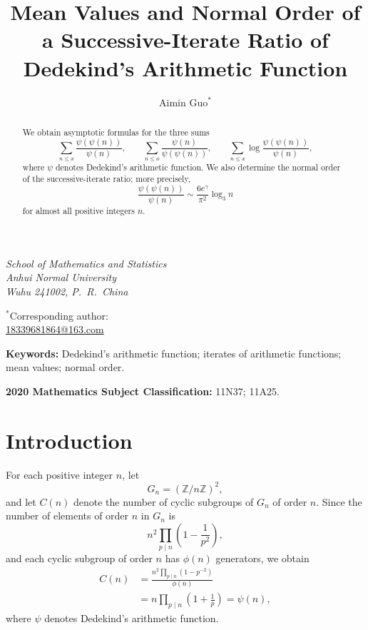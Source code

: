 \documentclass{article}
\title{Mean Values and Normal Order of a Successive-Iterate Ratio of Dedekind's Arithmetic Function}
\author{Aimin Guo$^{*}$}
\date{}
\theoremstyle{remark}
\begin{document}
\maketitle
\vspace{-2.0em}

\begin{center}
\small

\textit{School of Mathematics and Statistics}\\
\textit{Anhui Normal University}\\
\textit{Wuhu 241002, P.~R.~China}

\vspace{0.4em}

$^{*}$Corresponding author:\\
\underline{18339681864@163.com}

\end{center}

\begin{abstract}
We obtain asymptotic formulas for the three sums
\[
\sum_{n\le x}\frac{\psi(\psi(n))}{\psi(n)},\qquad
\sum_{n\le x}\frac{\psi(n)}{\psi(\psi(n))},\qquad
\sum_{n\le x}\log\frac{\psi(\psi(n))}{\psi(n)},
\]
where \(\psi\) denotes Dedekind's arithmetic function.
We also determine the normal order of the successive-iterate ratio;
more precisely,
\[
\frac{\psi(\psi(n))}{\psi(n)}
\sim
\frac{6e^\gamma}{\pi^2}\log_3 n
\]
for almost all positive integers \(n\).
\end{abstract}



\noindent
\textbf{Keywords:}
Dedekind's arithmetic function;
iterates of arithmetic functions;
mean values;
normal order.

\noindent
\textbf{2020 Mathematics Subject Classification:}
11N37; 11A25.


\section{Introduction}

For each positive integer \(n\), let
\[
G_n=(\mathbb Z/n\mathbb Z)^2,
\]
and let \(C(n)\) denote the number of cyclic subgroups of \(G_n\) of
order \(n\). Since the number of elements of order \(n\) in \(G_n\) is
\[
n^2\prod_{p\mid n}\left(1-\frac1{p^2}\right),
\]
and each cyclic subgroup of order \(n\) has \(\phi(n)\) generators, we
obtain
\[
\begin{aligned}
C(n)
&=
\frac{n^2\displaystyle\prod_{p\mid n}(1-p^{-2})}{\phi(n)}\\
&=
n\prod_{p\mid n}\left(1+\frac1p\right)
=
\psi(n),
\end{aligned}
\]
where \(\psi\) denotes Dedekind's arithmetic function.
\end{document}

